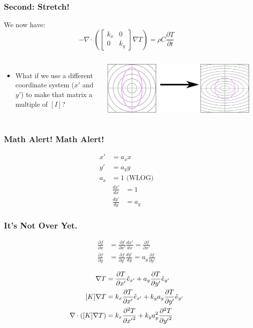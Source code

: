 \documentclass{beamer}
\begin{document}
\begin{frame}
\frametitle{Second: Stretch!}
We now have:
\begin{equation*}
-\nabla \cdot \left(\begin{bmatrix}k_x & 0\\ 0 & k_y\end{bmatrix}\nabla T \right)= \rho C\frac{\partial T}{\partial t}
\end{equation*}

\begin{columns}
    \begin{itemize}
    \item What if we use a different coordinate system (\(x'\) and \(y'\)) to make
    that matrix a multiple of \([I]\)?
    \end{itemize}
    \includegraphics[width=\textwidth]{fig/coordinate_transformation.png}
\end{columns}
\end{frame}

\begin{frame}
\frametitle{Math Alert! Math Alert!}

\begin{align*}
x' &= a_x x\\
y' &= a_y y\\
a_x &= 1 \textrm{ (WLOG)}
\end{align*}
\begin{align*}
\frac{dx'}{dx} &= 1\\
\frac{dy'}{dy} &= a_y
\end{align*}
\end{frame}


\begin{frame}
\frametitle{It's Not Over Yet.}
\begin{align*}
\frac{\partial f}{\partial x} &= \frac{\partial f}{\partial x'}\frac{dx'}{dx} = \frac{\partial f}{\partial x'}\\
\frac{\partial f}{\partial y} &= \frac{\partial f}{\partial y'}\frac{dy'}{dy} = a_y\frac{\partial f}{\partial y'}
\end{align*}

\begin{align*}
\nabla T &= \frac{\partial T}{\partial x'} \hat{e}_{x'} + a_y\frac{\partial T}{\partial y'} \hat{e}_{y'} \\
[K]\nabla T &= k_x\frac{\partial T}{\partial x'} \hat{e}_{x'} + k_ya_y\frac{\partial T}{\partial y'} \hat{e}_{y'}\\
\nabla \cdot \left([K]\nabla T\right) &= k_x\frac{\partial^2 T}{\partial {x'}^2} + k_ya_y^2\frac{\partial^2 T}{\partial {y'}^2}\\
\end{align*}
\end{frame}
\end{document}
